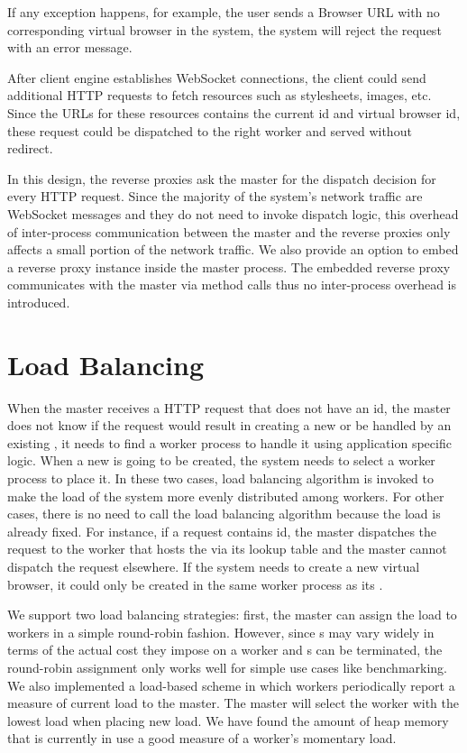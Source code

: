 If any exception happens, for example, the user sends a Browser URL with no
corresponding virtual browser in the system, the system will reject the
request with an error message.

After client engine establishes WebSocket connections, the client could send
additional HTTP requests to fetch resources such as stylesheets, images, etc.
Since the URLs for these resources contains the current \appins id and virtual
browser id, these request could be dispatched to the right worker and  served
without redirect.

In this design, the reverse proxies ask the master for the dispatch decision
for every HTTP request.  Since the majority of the system's network traffic
are WebSocket messages and they do not need to invoke dispatch logic,  this
overhead of inter-process communication between the master and the reverse
proxies   only affects a small portion of the network traffic. We also provide
an option to embed a reverse proxy instance inside the master process. The
embedded reverse proxy  communicates with the master via method calls thus no
inter-process overhead is introduced.

\section{Load Balancing}
\label{sec:lb}

When the master receives a HTTP request that does not have an \appins id,
the master does not know if the request would result in creating a new \appins
or be handled by an existing \appins,
it needs to find a worker process to handle it using application specific
logic.
When a new \appins{} is going to be created,
the system needs to select a worker process to place it.
In these two cases, load balancing algorithm is invoked to make the load
of the system more evenly distributed among workers.
For other cases, there is no need to call the load balancing algorithm
because the load is already fixed.
For instance,
if a request contains \appins id, the master dispatches the request to
the worker that hosts the \appins via its lookup table and
the master cannot dispatch the request elsewhere.
If the system needs to create a new virtual browser,
it could only be created in the same worker process as its \appins{}.



We support two load balancing strategies: first, the master can assign the
load to workers in a simple round-robin fashion. However, since \appins{}s may
vary widely in terms of the actual cost they impose on a worker and \appins{}s
can be terminated,  the round-robin assignment only works well for simple use
cases like benchmarking. We also implemented a load-based scheme in which
workers periodically report a measure of current load to the master. The
master will select the worker with the lowest load when placing new load.  We
have found the amount of heap memory that is currently in use a good measure
of a worker's  momentary load.

